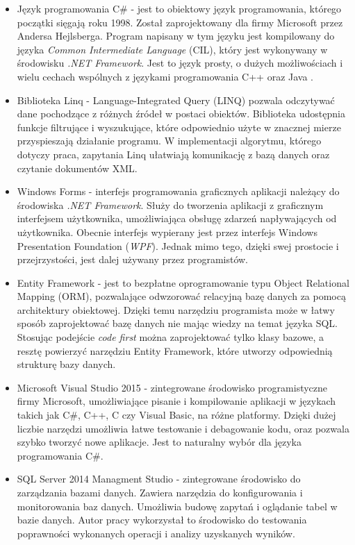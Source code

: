 \begin{itemize}
	\item Język programowania C\# - jest to obiektowy język programowania, którego początki sięgają roku 1998. Został zaprojektowany dla firmy Microsoft przez Andersa Hejlsberga. Program napisany w tym języku jest kompilowany do języka \textit{Common Intermediate Language} (CIL), który jest wykonywany w środowisku \textit{.NET Framework}. Jest to język prosty, o dużych możliwościach i wielu cechach wspólnych z językami programowania C++ oraz Java \cite{Csharp}. 
	
	\item Biblioteka Linq - Language-Integrated Query (LINQ) pozwala odczytywać dane pochodzące z różnych źródeł w postaci obiektów. Biblioteka udostępnia funkcje filtrujące i wyszukujące, które odpowiednio użyte w znacznej mierze przyspieszają działanie programu. W implementacji algorytmu, którego dotyczy praca, zapytania Linq ułatwiają komunikację z bazą danych oraz czytanie dokumentów XML.
	
	\item Windows Forms - interfejs programowania graficznych aplikacji należący do środowiska \textit{.NET Framework}. Służy do tworzenia aplikacji z graficznym interfejsem użytkownika, umożliwiająca obsługę zdarzeń napływających od użytkownika. Obecnie interfejs wypierany jest przez interfejs Windows Presentation Foundation  (\textit{WPF}). Jednak mimo tego, dzięki swej prostocie i przejrzystości, jest dalej używany przez programistów.
	
	\item Entity Framework - jest to bezpłatne oprogramowanie typu Object Relational Mapping (ORM), pozwalające odwzorować relacyjną bazę danych za pomocą architektury obiektowej. Dzięki temu narzędziu programista może w łatwy sposób zaprojektować bazę danych nie mając wiedzy na temat języka SQL. Stosując podejście \textit{code first} można zaprojektować tylko klasy bazowe, a resztę powierzyć narzędziu Entity Framework, które utworzy odpowiednią strukturę bazy danych.
	
	\item Microsoft Visual Studio 2015 - zintegrowane środowisko programistyczne firmy Microsoft, umożliwiające pisanie i kompilowanie aplikacji w językach takich jak C\#, C++, C czy Visual Basic, na różne platformy. Dzięki dużej liczbie narzędzi umożliwia łatwe testowanie i debagowanie kodu, oraz pozwala szybko tworzyć nowe aplikacje. Jest to naturalny wybór dla języka programowania C\#.
	
	\item SQL Server 2014 Managment Studio - zintegrowane środowisko do zarządzania bazami danych. Zawiera narzędzia do konfigurowania i monitorowania baz danych. Umożliwia budowę zapytań i oglądanie tabel w bazie danych. Autor pracy wykorzystał to środowisko do testowania poprawności wykonanych operacji i analizy uzyskanych wyników.
\end{itemize}


